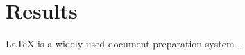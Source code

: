 \renewcommand*\chapterpagestyle{scrheadings}
\chapter{Results}
LaTeX is a widely used document preparation system \cite{wiki:latex}. %
